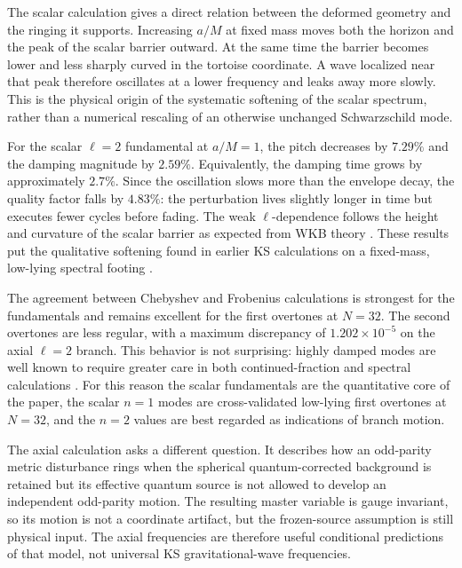 \documentclass[12pt,a4paper]{article}
\begin{document}
\color{blue}
The scalar calculation gives a direct relation between the deformed geometry
and the ringing it supports.  Increasing \(a/M\) at fixed mass moves both the
horizon and the peak of the scalar barrier outward.  At the same time the
barrier becomes lower and less sharply curved in the tortoise coordinate.  A
wave localized near that peak therefore oscillates at a lower frequency and
leaks away more slowly.  This is the physical origin of the systematic
softening of the scalar spectrum, rather than a numerical rescaling of an
otherwise unchanged Schwarzschild mode.
\color{black}

\color{blue}
For the scalar \(\ell=2\) fundamental at \(a/M=1\), the pitch decreases by
\(7.29\%\) and the damping magnitude by \(2.59\%\).  Equivalently, the damping
time grows by approximately \(2.7\%\).  Since the oscillation slows more than
the envelope decay, the quality factor falls by \(4.83\%\): the perturbation
lives slightly longer in time but executes fewer cycles before fading.  The
weak \(\ell\)-dependence follows the height and curvature of the scalar barrier
as expected from WKB theory \cite{Ferrari1984,Konoplya2003}.  These results put
the qualitative softening found in earlier KS calculations on a fixed-mass,
low-lying spectral footing \cite{Konoplya2020,Bolokhov2025}.
\color{black}

\color{blue}
The agreement between Chebyshev and Frobenius calculations is strongest for the
fundamentals and remains excellent for the first overtones at \(N=32\). The
second overtones are less regular, with a maximum discrepancy of
\(1.202\times10^{-5}\) on the axial \(\ell=2\) branch. This behavior is not
surprising: highly damped modes are well known to require greater care in both
continued-fraction and spectral calculations \cite{Leaver1985,Nollert1993,Bolokhov2025,Chen2025}.
For this reason the scalar fundamentals are the quantitative core of the paper,
the scalar \(n=1\) modes are cross-validated low-lying first overtones at
\(N=32\), and the \(n=2\) values are best regarded as indications of branch
motion.

The axial calculation asks a different question.  It describes how an
odd-parity metric disturbance rings when the spherical quantum-corrected
background is retained but its effective quantum source is not allowed to
develop an independent odd-parity motion.  The resulting master variable is
gauge invariant, so its motion is not a coordinate artifact, but the
frozen-source assumption is still physical input.  The axial frequencies are
therefore useful conditional predictions of that model, not universal KS
gravitational-wave frequencies.
\end{document}

